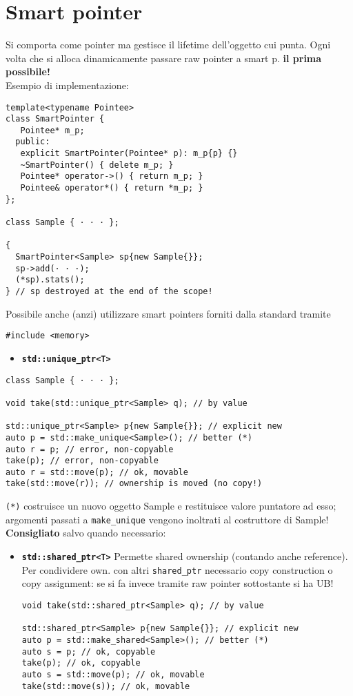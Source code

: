 \documentclass[10pt, oneside]{Book}
\begin{document}
\section{Smart pointer}
Si comporta come pointer ma gestisce il lifetime dell'oggetto cui punta. Ogni volta che si alloca dinamicamente passare raw pointer a smart p. \textbf{il prima possibile!}
\\Esempio di implementazione:
\begin{verbatim}
template<typename Pointee>
class SmartPointer {
   Pointee* m_p;
  public:
   explicit SmartPointer(Pointee* p): m_p{p} {}
   ~SmartPointer() { delete m_p; }
   Pointee* operator->() { return m_p; }
   Pointee& operator*() { return *m_p; }
};

class Sample { · · · };

{
  SmartPointer<Sample> sp{new Sample{}};
  sp->add(· · ·);
  (*sp).stats();
} // sp destroyed at the end of the scope!
\end{verbatim}
Possibile anche (anzi) utilizzare smart pointers forniti dalla standard tramite
\begin{verbatim}
#include <memory>
\end{verbatim}
\begin{itemize}
\item \textbf{\texttt{std::unique\_ptr<T>}}
\end{itemize}
\begin{verbatim}
class Sample { · · · };

void take(std::unique_ptr<Sample> q); // by value

std::unique_ptr<Sample> p{new Sample{}}; // explicit new
auto p = std::make_unique<Sample>(); // better (*)
auto r = p; // error, non-copyable
take(p); // error, non-copyable
auto r = std::move(p); // ok, movable
take(std::move(r)); // ownership is moved (no copy!)
\end{verbatim}
\texttt{(*)} costruisce un nuovo oggetto Sample e restituisce valore puntatore ad esso; argomenti passati a \texttt{make\_unique} vengono inoltrati al costruttore di Sample!
\\\textbf{Consigliato} salvo quando necessario:
\begin{itemize}

\item \textbf{\texttt{std::shared\_ptr<T>}} Permette shared ownership (contando anche reference). Per condividere own. con altri \texttt{shared\_ptr} necessario copy construction o copy assignment: se si fa invece tramite raw pointer sottostante si ha UB!
\begin{verbatim}
void take(std::shared_ptr<Sample> q); // by value

std::shared_ptr<Sample> p{new Sample{}}; // explicit new
auto p = std::make_shared<Sample>(); // better (*)
auto s = p; // ok, copyable
take(p); // ok, copyable
auto s = std::move(p); // ok, movable
take(std::move(s)); // ok, movable
\end{verbatim}
\end{itemize}
\end{document}
